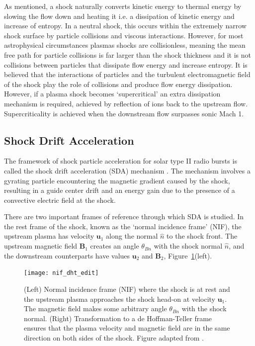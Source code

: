 As mentioned, a shock naturally converts kinetic energy to thermal energy by slowing the flow down and heating it i.e. a dissipation of kinetic energy and increase of entropy. In a neutral shock, this occurs within the extremely narrow shock surface by particle collisions and viscous interactions. However, for most astrophysical circumstances plasmas shocks are collisionless, meaning the mean free path for particle collisions is far larger than the shock thickness and it is not collisions between particles that dissipate flow energy and increase entropy. It is believed that the interactions of particles and the turbulent electromagnetic field of the shock play the role of collisions and produce flow energy dissipation. However, if a plasma shock becomes `supercritical' an extra dissipation mechanism is required, achieved by reflection of ions back to the upstream flow. Supercriticality is achieved when the downstream flow surpasses sonic Mach 1.


\subsection{Shock Drift Acceleration}\label{sec:30}

The framework of shock particle acceleration for solar type II radio bursts is called the shock drift acceleration (SDA) mechanism \citep{holman1983}. The mechanism involves a gyrating particle encountering the magnetic gradient caused by the shock, resulting in a guide center drift and an energy gain due to the presence of a convective electric field at the shock. 

There are two important frames of reference through which SDA is studied. In the rest frame of the shock, known as the \textquoteleft normal incidence frame' (NIF), the upstream plasma has velocity $\mathbf{u}_1$ along the normal $\hat{n}$ to the shock front. The upstream magnetic field $\mathbf{B}_1$ creates an angle $\theta_{Bn}$ with the shock normal $\hat{n}$, and the downstream counterparts have values $\mathbf{u}_2$ and $\mathbf{B}_2$, Figure~\ref{fig:nif_dht}(left). 

\begin{figure}[!t] 
\begin{center}
\texttt{[image: nif\_dht\_edit]}
\caption[Normal incidence and de Hoffman-Teller reference frames]{(Left) Normal incidence frame (NIF) where the shock is at rest and the upstream plasma approaches the shock head-on at velocity $\mathbf{u}_1$. The magnetic field makes some arbitrary angle $\theta_{Bn}$ with the shock normal. (Right) Transformation to a de Hoffman-Teller frame ensures that the plasma velocity and magnetic field are in the same direction on both sides of the shock. Figure adapted from \citep{ball2001}.}
\label{fig:nif_dht}
\end{center}
\end{figure}

